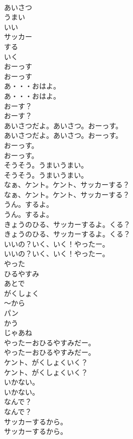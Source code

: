 \documentclass[8pt]{extreport}
\begin{document}
\begin{CJK}{UTF8}{min}
\\	あいさつ
\\	うまい
\\	いい
\\	サッカー
\\	する
\\	いく
\\	おーっす	
\\	おーっす 
\\	あ・・・おはよ。	
\\	あ・・・おはよ。 
\\	おーす？	
\\	おーす？ 
\\	あいさつだよ。あいさつ。おーっす。	
\\	あいさつだよ。あいさつ。おーっす。 
\\	おーっす。	
\\	おーっす。 
\\	そうそう。うまいうまい。	
\\	そうそう。うまいうまい。 
\\	なぁ、ケント。ケント、サッカーする？	
\\	なぁ、ケント。ケント、サッカーする？ 
\\	うん。するよ。	
\\	うん。するよ。 
\\	きょうのひる、サッカーするよ。くる？	
\\	きょうのひる、サッカーするよ。くる？ 
\\	いいの？いく、いく！やったー。	
\\	いいの？いく、いく！やったー。 
\\	やった
\\	ひるやすみ
\\	あとで
\\	がくしょく
\\	～から
\\	パン
\\	かう
\\	じゃあね
\\	やったーおひるやすみだー。	
\\	やったーおひるやすみだー。 
\\	ケント、がくしょくいく？	
\\	ケント、がくしょくいく？ 
\\	いかない。	
\\	いかない。 
\\	なんで？	
\\	なんで？ 
\\	サッカーするから。	
\\	サッカーするから。 

\end{CJK}
\end{document}
